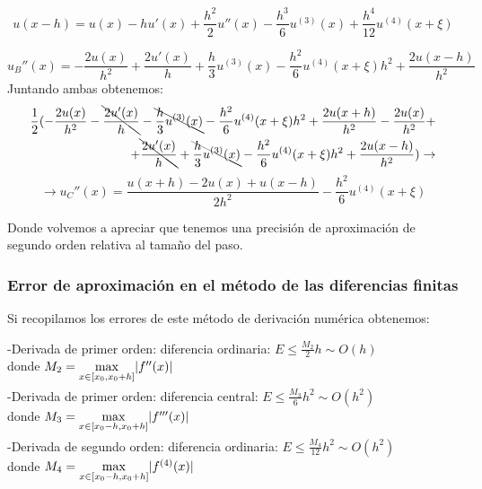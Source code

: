 \documentclass{article}
\begin{document}
	\begin{equation*}
		u(x-h)=u(x) - hu'(x)+ \frac{h^2}{2}  u''(x) - \frac{h^3}{6} u^{(3)}(x)+\frac{h^4}{12}u^{(4)}(x+\xi)
	\end{equation*}
	
	\begin{equation}
		u_B''(x)=-\frac{2u(x)}{h^2}  + \frac{2u'(x)}{h} + \frac{h}{3}u^{(3)}(x)-\frac{h^2}{6}u^{(4)}(x+\xi) {h^2} + \frac{2u(x-h)}{h^2}
	\end{equation}
	Juntando ambas obtenemos:
	\begin{eqnarray*}
		\frac{1}{2}(-\frac{2u(x)}{h^2} - \bcancel{\frac{2u'(x)}{h}} - \bcancel{\frac{h}{3}u^{(3)}(x)}-\frac{h^2}{6}u^{(4)}(x+\xi) {h^2} + \frac{2u(x+h)}{h^2} -\frac{2u(x)}{h^2} + \\ + \bcancel{\frac{2u'(x)}{h}} +\bcancel{\frac{h}{3}u^{(3)}(x)}-\frac{h^2}{6}u^{(4)}(x+\xi) {h^2} + \frac{2u(x-h)}{h^2}) \rightarrow
	\end{eqnarray*}
	\begin{equation}
		\rightarrow u_C''(x)=\frac{u(x+h)-2u(x)+u(x-h)}{2h^2} - \frac{h^2}{6}u^{(4)}(x+\xi)
	\end{equation}
	
	Donde volvemos a apreciar que tenemos una precisión de aproximación de segundo orden relativa al tamaño del paso.
	
\subsubsection{Error de aproximación en el método de las diferencias finitas}

Si recopilamos los errores de este método de derivación numérica obtenemos:

\begin{flushleft}
	-Derivada de primer orden: diferencia ordinaria: 
	$E \leq \frac{M_2}{2}h \sim O(h)$\\ donde $M_2 = \smash{\displaystyle\max_{x \in [x_0,x_0+h]}} |f''(x)|$
\end{flushleft}

\begin{flushleft}
	-Derivada de primer orden: diferencia central: 
	$E \leq \frac{M_3}{6}h^2 \sim O(h^2)$\\ donde $M_3 = \smash{\displaystyle\max_{x \in [x_0-h,x_0+h]}} |f'''(x)|$
\end{flushleft}

\begin{flushleft}
	-Derivada de segundo orden: diferencia ordinaria:
	$E \leq \frac{M_4}{12}h^2 \sim O(h^2)$\\ donde $M_4 = \smash{\displaystyle\max_{x \in [x_0-h,x_0+h]}} |f^{(4)}(x)|$
\end{flushleft}
\end{document}
